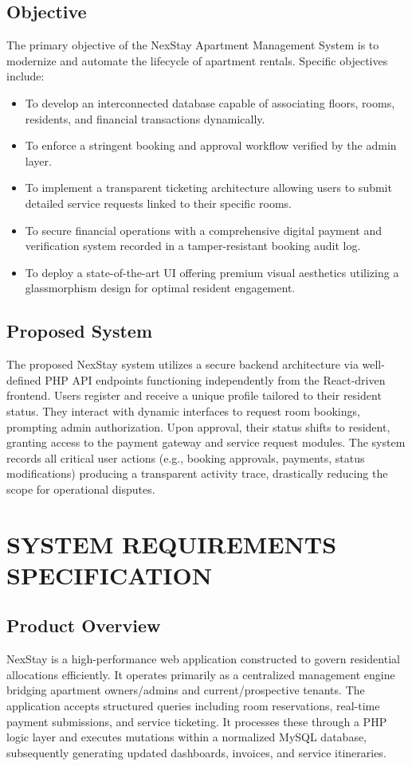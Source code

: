 \documentclass[12pt,a4paper]{report}
\begin{document}
\section{Objective}
The primary objective of the NexStay Apartment Management System is to modernize and automate the lifecycle of apartment rentals. Specific objectives include:
\begin{itemize}
    \item To develop an interconnected database capable of associating floors, rooms, residents, and financial transactions dynamically.
    \item To enforce a stringent booking and approval workflow verified by the admin layer.
    \item To implement a transparent ticketing architecture allowing users to submit detailed service requests linked to their specific rooms.
    \item To secure financial operations with a comprehensive digital payment and verification system recorded in a tamper-resistant booking audit log.
    \item To deploy a state-of-the-art UI offering premium visual aesthetics utilizing a glassmorphism design for optimal resident engagement.
\end{itemize}

\section{Proposed System}
The proposed NexStay system utilizes a secure backend architecture via well-defined PHP API endpoints functioning independently from the React-driven frontend. Users register and receive a unique profile tailored to their resident status. They interact with dynamic interfaces to request room bookings, prompting admin authorization. Upon approval, their status shifts to resident, granting access to the payment gateway and service request modules. The system records all critical user actions (e.g., booking approvals, payments, status modifications) producing a transparent activity trace, drastically reducing the scope for operational disputes.

\chapter{SYSTEM REQUIREMENTS SPECIFICATION}

\section{Product Overview}
NexStay is a high-performance web application constructed to govern residential allocations efficiently. It operates primarily as a centralized management engine bridging apartment owners/admins and current/prospective tenants. The application accepts structured queries including room reservations, real-time payment submissions, and service ticketing. It processes these through a PHP logic layer and executes mutations within a normalized MySQL database, subsequently generating updated dashboards, invoices, and service itineraries.
\end{document}
